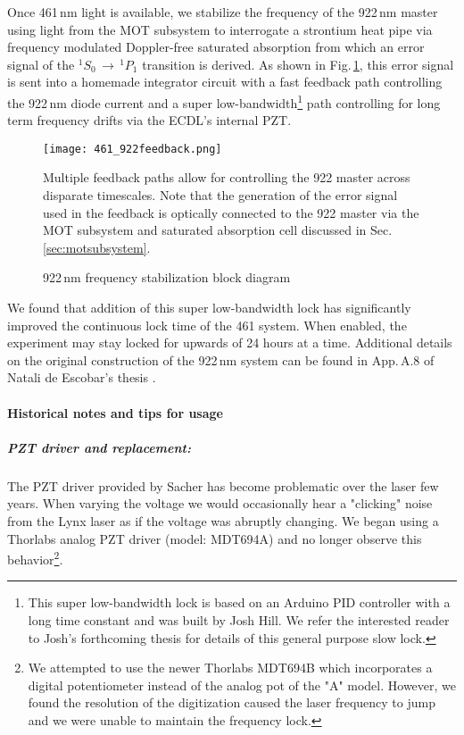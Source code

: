 Once 461\,nm light is available, we stabilize the frequency of the 922\,nm master using light from the MOT subsystem to interrogate a strontium heat pipe via frequency modulated Doppler-free saturated absorption from which an error signal of the $^1S_0\,\rightarrow\,^1P_1$ transition is derived.
As shown in Fig.\,\ref{fig:922freqLock}, this error signal is sent into a homemade integrator circuit with a fast feedback path controlling the 922\,nm diode current and a super low-bandwidth\footnote{This super low-bandwidth lock is based on an Arduino PID controller with a long time constant and was built by Josh Hill.
We refer the interested reader to Josh's forthcoming thesis for details of this general purpose slow lock.} 
path controlling for long term frequency drifts via the ECDL's internal PZT.
	\begin{figure}
		\centerline{
		\texttt{[image: 461\_922feedback.png]}}
		\caption{922\,nm frequency stabilization block diagram}{Multiple feedback paths allow for controlling the 922 master across disparate timescales. Note that the generation of the error signal used in the feedback is optically connected to the 922 master via the MOT subsystem and saturated absorption cell discussed in Sec.\,\ref{sec:motsubsystem}.}
		\label{fig:922freqLock}
	\end{figure} 
We found that addition of this super low-bandwidth lock has significantly improved the continuous lock time of the 461 system. 
When enabled, the experiment may stay locked for upwards of 24 hours at a time. 
Additional details on the original construction of the 922\,nm system can be found in App.\,A.8 of Natali de Escobar's thesis \cite{MartinezdeEscolar2010}.

\paragraph{Historical notes and tips for usage}
\subparagraph{PZT driver and replacement:}
The PZT driver provided by Sacher has become problematic over the laser few years.
When varying the voltage we would occasionally hear a "clicking" noise from the Lynx laser as if the voltage was abruptly changing.
We began using a Thorlabs analog PZT driver (model: MDT694A) and no longer observe this behavior\footnote{We attempted to use the newer Thorlabs MDT694B which incorporates a digital potentiometer instead of the analog pot of the "A" model.
However, we found the resolution of the digitization caused the laser frequency to jump and we were unable to maintain the frequency lock.}.

